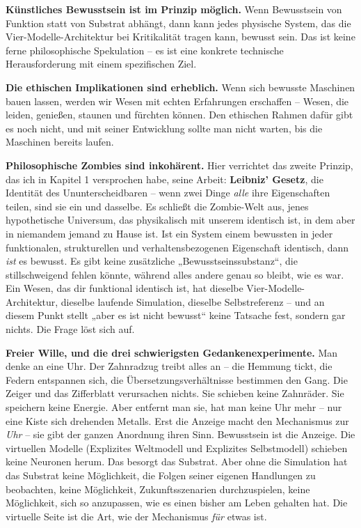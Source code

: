 \documentclass[11pt, twoside, openright]{book}
\begin{document}
\textbf{Künstliches Bewusstsein ist im Prinzip möglich.} Wenn Bewusstsein von Funktion statt von Substrat abhängt, dann kann jedes physische System, das die Vier-Modelle-Architektur bei Kritikalität tragen kann, bewusst sein. Das ist keine ferne philosophische Spekulation -- es ist eine konkrete technische Herausforderung mit einem spezifischen Ziel.

\textbf{Die ethischen Implikationen sind erheblich.} Wenn sich bewusste Maschinen bauen lassen, werden wir Wesen mit echten Erfahrungen erschaffen -- Wesen, die leiden, genießen, staunen und fürchten können. Den ethischen Rahmen dafür gibt es noch nicht, und mit seiner Entwicklung sollte man nicht warten, bis die Maschinen bereits laufen.

\textbf{Philosophische Zombies sind inkohärent.} Hier verrichtet das zweite Prinzip, das ich in Kapitel 1 versprochen habe, seine Arbeit: \textbf{Leibniz' Gesetz}, die Identität des Ununterscheidbaren -- wenn zwei Dinge \textit{alle} ihre Eigenschaften teilen, sind sie ein und dasselbe. Es schließt die Zombie-Welt aus, jenes hypothetische Universum, das physikalisch mit unserem identisch ist, in dem aber in niemandem jemand zu Hause ist. Ist ein System einem bewussten in jeder funktionalen, strukturellen und verhaltensbezogenen Eigenschaft identisch, dann \textit{ist} es bewusst. Es gibt keine zusätzliche „Bewusstseinssubstanz“, die stillschweigend fehlen könnte, während alles andere genau so bleibt, wie es war. Ein Wesen, das dir funktional identisch ist, hat dieselbe Vier-Modelle-Architektur, dieselbe laufende Simulation, dieselbe Selbstreferenz -- und an diesem Punkt stellt „aber es ist nicht bewusst“ keine Tatsache fest, sondern gar nichts. Die Frage löst sich auf.

\textbf{Freier Wille, und die drei schwierigsten Gedankenexperimente.} Man denke an eine Uhr. Der Zahnradzug treibt alles an -- die Hemmung tickt, die Federn entspannen sich, die Übersetzungsverhältnisse bestimmen den Gang. Die Zeiger und das Zifferblatt verursachen nichts. Sie schieben keine Zahnräder. Sie speichern keine Energie. Aber entfernt man sie, hat man keine Uhr mehr -- nur eine Kiste sich drehenden Metalls. Erst die Anzeige macht den Mechanismus zur \textit{Uhr} -- sie gibt der ganzen Anordnung ihren Sinn. Bewusstsein ist die Anzeige. Die virtuellen Modelle (Explizites Weltmodell und Explizites Selbstmodell) schieben keine Neuronen herum. Das besorgt das Substrat. Aber ohne die Simulation hat das Substrat keine Möglichkeit, die Folgen seiner eigenen Handlungen zu beobachten, keine Möglichkeit, Zukunftsszenarien durchzuspielen, keine Möglichkeit, sich so anzupassen, wie es einen bisher am Leben gehalten hat. Die virtuelle Seite ist die Art, wie der Mechanismus \textit{für} etwas ist.
\end{document}
